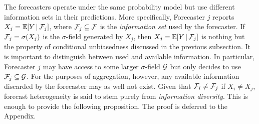 \documentclass[11pt]{article}
\newcommand{\E}{\mathbb{E}}
\theoremstyle{definition}
\theoremstyle{definition}
\def\F{{\cal F}}
\def\G{{\cal G}}
\def\E{{\mathbb E}}
\def\|{\, | \,}
\begin{document}

The forecasters operate under the same probability model but use different information sets in their predictions.
More specifically,
Forecaster $j$ reports $X_j = \E[Y \| \F_j]$, where $\F_j \subseteq \F$ is
the \textit{information set} used by the forecaster. If $\F_j = \sigma(X_j)$ is the $\sigma$-field generated by $X_j$, then $X_j = \E[Y \| \F_j]$ is nothing but the property of conditional unbiasedness discussed in the previous subsection. It is important to distinguish between used and available information. In particular, Forecaster $j$ may have access to some larger $\sigma$-field $\G$ but only decides to use $\F_j \subseteq \G$. For the purposes of aggregation, however, any available information discarded by the forecaster may as well not exist. 
Given that $\F_i \neq \F_j$ if $X_i \neq X_j$, forecast heterogeneity is said to stem purely from \textit{information diversity}. 
 This is enough to provide the following proposition. The proof is deferred to the Appendix.
 
\end{document}
